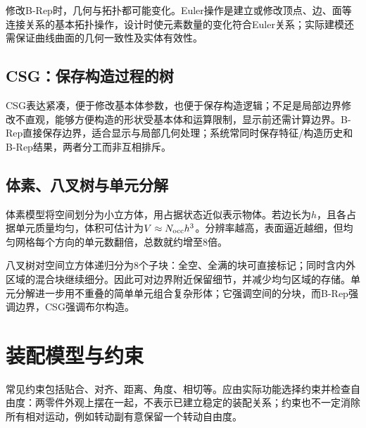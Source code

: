 修改B-Rep时，几何与拓扑都可能变化。Euler操作是建立或修改顶点、边、面等连接关系的基本拓扑操作，设计时使元素数量的变化符合Euler关系；实际建模还需保证曲线曲面的几何一致性及实体有效性。

\subsection{CSG：保存构造过程的树}


CSG表达紧凑，便于修改基本体参数，也便于保存构造逻辑；不足是局部边界修改不直观，能够方便构造的形状受基本体和运算限制，显示前还需计算边界。B-Rep直接保存边界，适合显示与局部几何处理；系统常同时保存特征/构造历史和B-Rep结果，两者分工而非互相排斥。

\subsection{体素、八叉树与单元分解}
体素模型将空间划分为小立方体，用占据状态近似表示物体。若边长为$h$，且各占据单元质量均匀，体积可估计为$V\approx N_{\rm occ}h^3$。分辨率越高，表面逼近越细，但均匀网格每个方向的单元数翻倍，总数就约增至8倍。

八叉树对空间立方体递归分为8个子块：全空、全满的块可直接标记；同时含内外区域的混合块继续细分。因此可对边界附近保留细节，并减少均匀区域的存储。单元分解进一步用不重叠的简单单元组合复杂形体；它强调空间的分块，而B-Rep强调边界，CSG强调布尔构造。

\section{装配模型与约束}

常见约束包括贴合、对齐、距离、角度、相切等。应由实际功能选择约束并检查自由度：两零件外观上摆在一起，不表示已建立稳定的装配关系；约束也不一定消除所有相对运动，例如转动副有意保留一个转动自由度。

